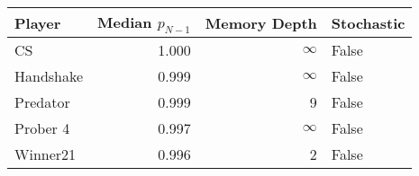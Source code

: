 \begin{tabular}{lrrl}
\toprule
    Player &  Median $p_{N-1}$ &  Memory Depth & Stochastic \\
\midrule
        CS &             1.000 &            \(\infty\) &      False \\
 Handshake &             0.999 &            \(\infty\) &      False \\
  Predator &             0.999 &             9 &      False \\
  Prober 4 &             0.997 &            \(\infty\) &      False \\
  Winner21 &             0.996 &             2 &      False \\
\bottomrule
\end{tabular}
